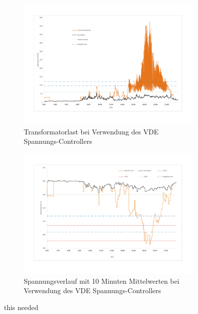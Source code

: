 \begin{figure}
	\begin{subfigure}{\linewidth}
		\includegraphics[scale=0.5]{img/VDE_tau/TrafoLast8.pdf}
		\caption{Transformatorlast bei Verwendung des VDE Spannungs-Controllers}
		\label{Abb_VDEtauTrafoLast}
	\end{subfigure}
	\begin{subfigure}{\linewidth}
		\includegraphics[scale=0.5]{img/VDE_tau/Voltage2.pdf}
		\caption{Spannungsverlauf mit 10 Minuten Mittelwerten bei Verwendung des VDE Spannungs-Controllers}
		\label{Abb_VDEtauSpannung10m}
	\end{subfigure}
	\caption{this needed}
\end{figure}

